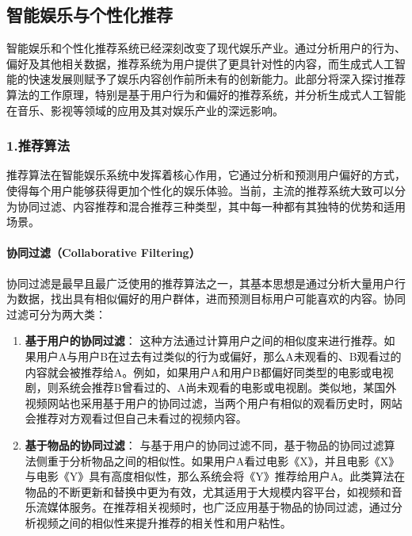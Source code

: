 
\subsection{智能娱乐与个性化推荐}

智能娱乐和个性化推荐系统已经深刻改变了现代娱乐产业。通过分析用户的行为、偏好及其他相关数据，推荐系统为用户提供了更具针对性的内容，而生成式人工智能的快速发展则赋予了娱乐内容创作前所未有的创新能力。此部分将深入探讨推荐算法的工作原理，特别是基于用户行为和偏好的推荐系统，并分析生成式人工智能在音乐、影视等领域的应用及其对娱乐产业的深远影响。

\subsubsection{1.推荐算法}

推荐算法在智能娱乐系统中发挥着核心作用，它通过分析和预测用户偏好的方式，使得每个用户能够获得更加个性化的娱乐体验。当前，主流的推荐系统大致可以分为协同过滤、内容推荐和混合推荐三种类型，其中每一种都有其独特的优势和适用场景。

\paragraph{协同过滤（Collaborative Filtering）}

协同过滤是最早且最广泛使用的推荐算法之一，其基本思想是通过分析大量用户行为数据，找出具有相似偏好的用户群体，进而预测目标用户可能喜欢的内容。协同过滤可分为两大类：

\begin{enumerate}
    \item \textbf{基于用户的协同过滤}： 这种方法通过计算用户之间的相似度来进行推荐。如果用户A与用户B在过去有过类似的行为或偏好，那么A未观看的、B观看过的内容就会被推荐给A。例如，如果用户A和用户B都偏好同类型的电影或电视剧，则系统会推荐B曾看过的、A尚未观看的电影或电视剧。类似地，某国外视频网站也采用基于用户的协同过滤，当两个用户有相似的观看历史时，网站会推荐对方观看过但自己未看过的视频内容。
    \item \textbf{基于物品的协同过滤}： 与基于用户的协同过滤不同，基于物品的协同过滤算法侧重于分析物品之间的相似性。如果用户A看过电影《X》，并且电影《X》与电影《Y》具有高度相似性，那么系统会将《Y》推荐给用户A。此类算法在物品的不断更新和替换中更为有效，尤其适用于大规模内容平台，如视频和音乐流媒体服务。在推荐相关视频时，也广泛应用基于物品的协同过滤，通过分析视频之间的相似性来提升推荐的相关性和用户粘性。
\end{enumerate}

